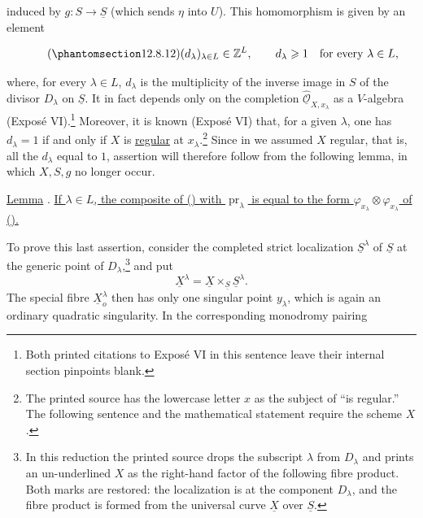 \begin{center}
\end{center}

\noindent
induced by $g:S\longrightarrow\underline S$ (which sends $\eta$ into
$U$). This homomorphism is given by an element

\begin{equation}\tag{\SGARefTarget{sga7.sga7i.eix.n12-8-12}{12.8.12}}
 (d_\lambda)_{\lambda\in L}\in\mathbb Z^L,\qquad
 d_\lambda\geqslant1\quad\text{for every }\lambda\in L,
\end{equation}

\noindent
where, for every $\lambda\in L$, $d_\lambda$ is the multiplicity of the
inverse image in $S$ of the divisor $D_\lambda$ on $\underline S$. It in
fact depends only on the completion
$\widehat{\underline{\mathcal O}}_{X,x_\lambda}$ as a $V$-algebra
(Expos\'e VI).\footnote{Both printed citations to Expos\'e VI in this
sentence leave their internal section pinpoints blank.} Moreover, it is
known (Expos\'e VI) that, for a given $\lambda$, one has $d_\lambda=1$ if
and only if $X$ is \underline{regular} at $x_\lambda$.\footnote{The
printed source has the lowercase letter $x$ as the subject of ``is
regular.'' The following sentence and the mathematical statement require
the scheme $X$.} Since in  we assumed $X$ regular, that is, all the
$d_\lambda$ equal to $1$, assertion  will therefore follow from the
following lemma, in which $X,S,g$ no longer occur.

\medskip
\noindent
\underline{Lemma} . \underline{If $\lambda\in L$, the composite of
() with $\operatorname{pr}_\lambda$ is equal to the form
$\varphi_{x_\lambda}\otimes\varphi_{x_\lambda}$ of ().}

\medskip
To prove this last assertion, consider the completed strict localization
$\underline S^\lambda$ of $\underline S$ at the generic point of
$D_\lambda$,\footnote{In this reduction the printed source drops the
subscript $\lambda$ from $D_\lambda$ and prints an un-underlined $X$ as
the right-hand factor of the following fibre product. Both marks are
restored: the localization is at the component $D_\lambda$, and the
fibre product is formed from the universal curve $\underline X$ over
$\underline S$.} and put
\[
 \underline X^\lambda=
 \underline X\times_{\underline S}\underline S^\lambda.
\]
The special fibre $\underline X_o^\lambda$ then has only one singular
point $y_\lambda$, which is again an ordinary quadratic singularity. In
the corresponding monodromy pairing

